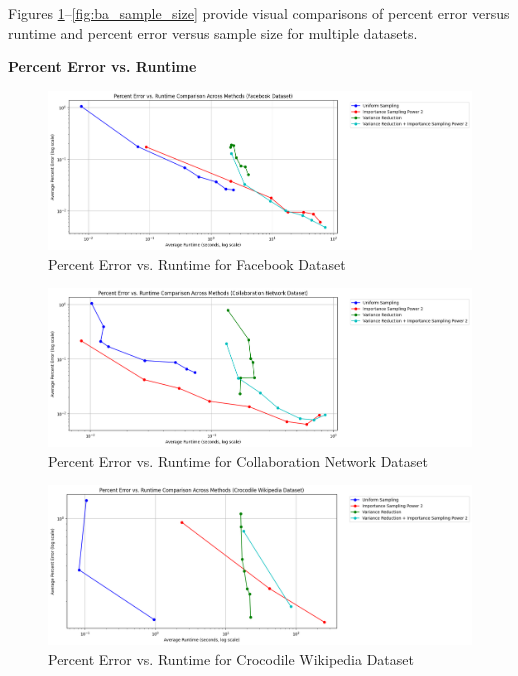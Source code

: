 \documentclass[11pt]{article}
\begin{document}
Figures \ref{fig:fb_runtime}--\ref{fig:ba_sample_size} provide visual comparisons of percent error versus runtime and percent error versus sample size for multiple datasets.

\textbf{Percent Error vs. Runtime}

\begin{figure}[H]
\centering
\includegraphics[width=0.9\linewidth]{plots/comparisons/fb/limited_method_percent_error_vs_runtime_comparison.png}
\caption{Percent Error vs. Runtime for Facebook Dataset}
\label{fig:fb_runtime}
\end{figure}

\begin{figure}[H]
\centering
\includegraphics[width=0.9\linewidth]{plots/comparisons/GrQc/limited_method_percent_error_vs_runtime_comparison.png}
\caption{Percent Error vs. Runtime for Collaboration Network Dataset}
\label{fig:grqc_runtime}
\end{figure}

\begin{figure}[H]
\centering
\includegraphics[width=0.9\linewidth]{plots/comparisons/croc/limited_method_percent_error_vs_runtime_comparison.png}
\caption{Percent Error vs. Runtime for Crocodile Wikipedia Dataset}
\label{fig:croc_runtime}
\end{figure}
\end{document}

